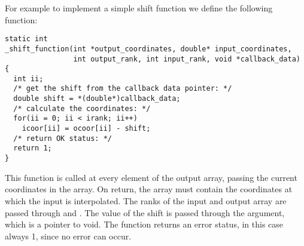 For example to implement a simple shift function we define the following 
function:
\begin{verbatim}
static int 
_shift_function(int *output_coordinates, double* input_coordinates,
                int output_rank, int input_rank, void *callback_data)
{
  int ii;
  /* get the shift from the callback data pointer: */
  double shift = *(double*)callback_data;
  /* calculate the coordinates: */
  for(ii = 0; ii < irank; ii++)
    icoor[ii] = ocoor[ii] - shift;
  /* return OK status: */
  return 1;
}
\end{verbatim}
This function is called at every element of the output array, passing the 
current coordinates in the  array. On return, the 
 array must contain the coordinates at which the 
input is interpolated. The ranks of the input and output array are passed 
through  and . The value of the shift is 
passed through the  argument, which is a pointer to 
void. The function returns an error status, in this case always 1, since no 
error can occur.

